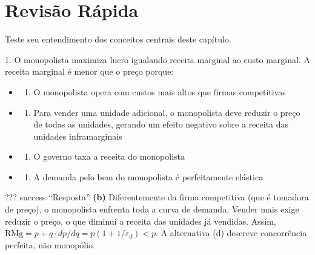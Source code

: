\documentclass[11pt,twoside,openright]{book}
\providecommand{\tightlist}{\setlength{\itemsep}{0pt}\setlength{\parskip}{0pt}}
\begin{document}
\section{Revisão Rápida}\label{revisuxe3o-ruxe1pida-1}

Teste seu entendimento dos conceitos centrais deste capítulo.

\begin{infobox}{1. O monopolista maximiza lucro igualando receita marginal ao custo marginal. A receita marginal é menor que o preço porque:}

\begin{itemize}
\tightlist
\item
  \begin{enumerate}
  \def\labelenumi{(\alph{enumi})}
  \tightlist
  \item
    O monopolista opera com custos mais altos que firmas competitivas
  \end{enumerate}
\item
  \begin{enumerate}
  \def\labelenumi{(\alph{enumi})}
  \setcounter{enumi}{1}
  \tightlist
  \item
    Para vender uma unidade adicional, o monopolista deve reduzir o
    preço de todas as unidades, gerando um efeito negativo sobre a
    receita das unidades inframarginais
  \end{enumerate}
\item
  \begin{enumerate}
  \def\labelenumi{(\alph{enumi})}
  \setcounter{enumi}{2}
  \tightlist
  \item
    O governo taxa a receita do monopolista
  \end{enumerate}
\item
  \begin{enumerate}
  \def\labelenumi{(\alph{enumi})}
  \setcounter{enumi}{3}
  \tightlist
  \item
    A demanda pelo bem do monopolista é perfeitamente elástica
  \end{enumerate}
\end{itemize}

??? success ``Resposta'' \textbf{(b)} Diferentemente da firma
competitiva (que é tomadora de preço), o monopolista enfrenta toda a
curva de demanda. Vender mais exige reduzir o preço, o que diminui a
receita das unidades já vendidas. Assim,
\(\text{RMg} = p + q \cdot dp/dq = p(1 + 1/\varepsilon_d) < p\). A
alternativa (d) descreve concorrência perfeita, não monopólio.

\end{infobox}
\end{document}
